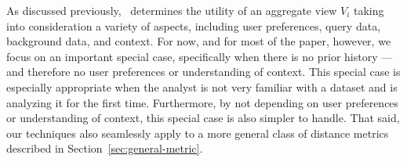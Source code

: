 




As discussed previously, \SeeDB\ determines the utility of an aggregate view $V_i$
taking into consideration a variety of aspects, including
user preferences, query data, background data, and context.
For now, and for most of the paper, however, we focus on an important special case,
specifically when there is no prior history --- and therefore no user preferences
or understanding of context.
This special case is especially appropriate when the analyst
is not very familiar with a dataset and is analyzing it for the first time.
Furthermore, by not depending on user preferences or understanding of context,
this special case is also simpler to handle.
That said, our techniques also seamlessly apply to a more general 
class of distance metrics described in Section~\ref{sec:general-metric}.

